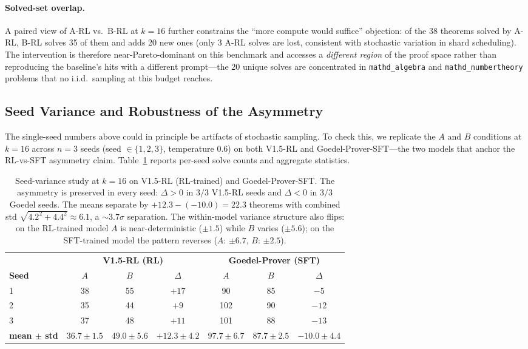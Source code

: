 \documentclass{article}
\begin{document}
\paragraph{Solved-set overlap.} A paired view of A-RL vs.\ B-RL at $k{=}16$ further constrains the ``more compute would suffice'' objection: of the 38 theorems solved by A-RL, B-RL solves 35 of them and adds 20 new ones (only 3 A-RL solves are lost, consistent with stochastic variation in shard scheduling). The intervention is therefore near-Pareto-dominant on this benchmark and accesses a \emph{different region} of the proof space rather than reproducing the baseline's hits with a different prompt---the 20 unique solves are concentrated in \texttt{mathd\_algebra} and \texttt{mathd\_numbertheory} problems that no i.i.d.\ sampling at this budget reaches.

\subsection{Seed Variance and Robustness of the Asymmetry}
\label{sec:seed}

The single-seed numbers above could in principle be artifacts of stochastic sampling. To check this, we replicate the $A$ and $B$ conditions at $k{=}16$ across $n{=}3$ seeds (seed $\in \{1,2,3\}$, temperature $0.6$) on both V1.5-RL and Goedel-Prover-SFT---the two models that anchor the RL-vs-SFT asymmetry claim. Table~\ref{tab:seeds} reports per-seed solve counts and aggregate statistics.

\begin{table}[h]
\centering
\small
\begin{tabular}{lcccccc}
\toprule
& \multicolumn{3}{c}{\textbf{V1.5-RL (RL)}} & \multicolumn{3}{c}{\textbf{Goedel-Prover (SFT)}} \\
\cmidrule(lr){2-4}\cmidrule(lr){5-7}
\textbf{Seed} & $A$ & $B$ & $\Delta$ & $A$ & $B$ & $\Delta$ \\
\midrule
1 & 38  & 55 & $+17$ & 90  & 85 & $-5$  \\
2 & 35  & 44 & $+9$  & 102 & 90 & $-12$ \\
3 & 37  & 48 & $+11$ & 101 & 88 & $-13$ \\
\midrule
\textbf{mean $\pm$ std} & $36.7 \pm 1.5$ & $49.0 \pm 5.6$ & $\mathbf{+12.3 \pm 4.2}$ & $97.7 \pm 6.7$ & $87.7 \pm 2.5$ & $\mathbf{-10.0 \pm 4.4}$ \\
\bottomrule
\end{tabular}
\caption{Seed-variance study at $k{=}16$ on V1.5-RL (RL-trained) and Goedel-Prover-SFT. The asymmetry is preserved in every seed: $\Delta > 0$ in $3/3$ V1.5-RL seeds and $\Delta < 0$ in $3/3$ Goedel seeds. The means separate by $+12.3-(-10.0)=22.3$ theorems with combined std $\sqrt{4.2^2+4.4^2}\approx 6.1$, a $\sim 3.7\sigma$ separation. The within-model variance structure also flips: on the RL-trained model $A$ is near-deterministic ($\pm 1.5$) while $B$ varies ($\pm 5.6$); on the SFT-trained model the pattern reverses ($A$: $\pm 6.7$, $B$: $\pm 2.5$).}
\label{tab:seeds}
\end{table}
\end{document}
